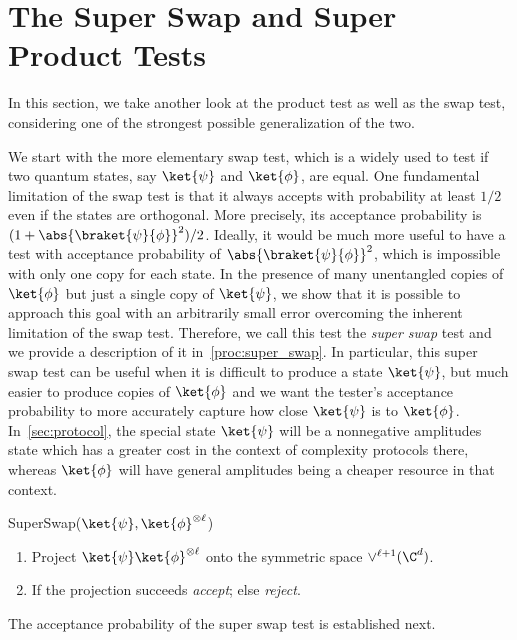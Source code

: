 \section{The Super Swap and Super Product Tests}\label{sec:super_swap}
In this section, we take another look at the product test as well as the swap test, considering one of the strongest possible generalization of the two.

We start with the more elementary swap test, which is a widely used to test if two quantum states, say $\ket{\psi}$ and $\ket{\phi}$, are equal.
One fundamental limitation of the swap test is that it always accepts with probability at least $1/2$ even if
the states are orthogonal. More precisely, its acceptance probability is $(1+\abs{\braket{\psi}{\phi}}^2)/2$.
Ideally, it would be much more useful to have a test with acceptance probability of $\abs{\braket{\psi}{\phi}}^2$, which is impossible with only one copy for each state.
In the presence of many unentangled copies of $\ket{\phi}$ but just a single copy of $\ket{\psi}$, we show that it
is possible to approach this goal with an arbitrarily small error overcoming the inherent limitation of the swap test. Therefore, we call this test the \emph{super swap} test
and we provide a description of it in~\cref{proc:super_swap}. In particular, this super swap test can be useful
when it is difficult to produce a state $\ket{\psi}$, but much easier to produce copies of $\ket{\phi}$
and we want the tester's acceptance probability to more accurately capture how close $\ket{\psi}$ is to $\ket{\phi}$.
In~\cref{sec:protocol}, the special state $\ket{\psi}$ will be a nonnegative amplitudes state which has a greater cost in the
context of complexity protocols there, whereas $\ket{\phi}$ will have general amplitudes being a cheaper resource in that context.  

\begin{algorithm}{SuperSwap}{($\ket{\psi},\ket{\phi}^{\otimes \ell}$)}
     \begin{enumerate}
           \item Project $\ket{\psi}\ket{\phi}^{\otimes \ell}$ onto the symmetric space $\vee^{\ell+1}(\C^{d})$.
           \item If the projection succeeds \emph{accept};        
            else \emph{reject}.
     \end{enumerate}
     \caption{Super Swap Test}\label{proc:super_swap}
\end{algorithm}

The acceptance probability of the super swap test is established next.

